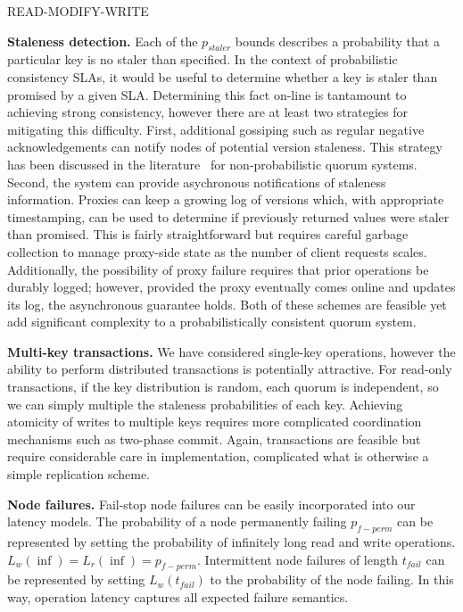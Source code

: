 \documentclass{vldb}
\begin{document}
READ-MODIFY-WRITE

\textbf{Staleness detection.} Each of the $p_{staler}$ bounds
describes a probability that a particular key is no staler than
specified.  In the context of probabilistic consistency SLAs, it would
be useful to determine whether a key is staler than promised by a
given SLA.  Determining this fact on-line is tantamount to achieving
strong consistency, however there are at least two strategies for
mitigating this difficulty. First, additional gossiping such as
regular negative acknowledgements can notify nodes of potential
version staleness.  This strategy has been discussed in the
literature~\cite{tocite} for non-probabilistic quorum systems.
Second, the system can provide asychronous notifications of staleness
information.  Proxies can keep a growing log of versions which, with
appropriate timestamping, can be used to determine if previously
returned values were staler than promised.  This is fairly
straightforward but requires careful garbage collection to manage
proxy-side state as the number of client requests scales.
Additionally, the possibility of proxy failure requires that prior
operations be durably logged; however, provided the proxy eventually
comes online and updates its log, the asynchronous guarantee holds.
Both of these schemes are feasible yet add significant complexity to a
probabilistically consistent quorum system.

\textbf{Multi-key transactions.} We have considered single-key operations,
however the ability to perform distributed transactions is potentially
attractive.  For read-only transactions, if the key distribution is
random, each quorum is independent, so we can simply multiple the
staleness probabilities of each key.  Achieving atomicity of writes to
multiple keys requires more complicated coordination mechanisms such
as two-phase commit.  Again, transactions are feasible but require
considerable care in implementation, complicated what is otherwise a
simple replication scheme.

\textbf{Node failures.} Fail-stop node failures can be easily
incorporated into our latency models. The probability of a node
permanently failing $p_{f-perm}$ can be represented by setting the
probability of infinitely long read and write
operations. $L_{w}(\inf)=L_{r}(\inf)=p_{f-perm}$.  Intermittent node
failures of length $t_{fail}$ can be represented by setting
$L_{w}(t_{fail})$ to the probability of the node failing.  In this
way, operation latency captures all expected failure semantics.
\end{document}
